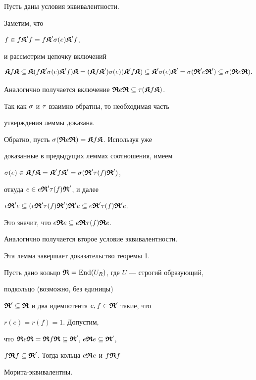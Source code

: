 \begin{pf} Пусть даны условия эквивалентности.


Заметим, что


$f \in f\K' f=f \K' \s(e) \K' f$,


и рассмотрим цепочку включений


$$


\K f \K \subseteq \K(f\K' \s(e) \K' f) \K


= (\K f \K') \s(e)(\K'f \K)


\subseteq \K' \s(e)\K' =


\s(\R' e \R')\subseteq \s(\R e \R).


$$


Аналогично получается включение $\R e \R \subseteq \t(\K f \K)$.


Так как $\s$ и $\t$ взаимно обратны, то необходимая часть


утверждения леммы доказана.





Обратно, пусть $\s(\R e\R) = \K f \K$. Используя уже


доказанные в предыдущих леммах соотношения, имеем


$\s(e) \in \K f \K =\K' f \K' =\s(\R' \t(f) \R')$,


откуда $e \in e\R' \t(f) \R' $, и далее


$e\R' e \subseteq (e\R' \t(f) \R')\R' e \subseteq e\R' \t(f) \R' e$.


Это значит, что $ e\R e \subseteq e\R \t(f) \R e$.


Аналогично получается второе условие эквивалентности.


\end{pf}





Эта лемма завершает доказательство теоремы 1.





\begin{cor}


Пусть дано кольцо $\R=\End(U_R)$, где $U$ --- строгий образующий,


подкольцо (возможно, без единицы)


$\R'\subseteq \R$ и два идемпотента $e,f\in \R'$ такие, что


$r(e)=r(f)=1$. Допустим,


что $\R e\R=\R f\R\subseteq \R'$, $e\R e\subseteq \R'$,


$f\R f\subseteq \R'$. Тогда кольца $e\R e$ и $f\R f$


Морита-эквивалентны.


\end{cor}





